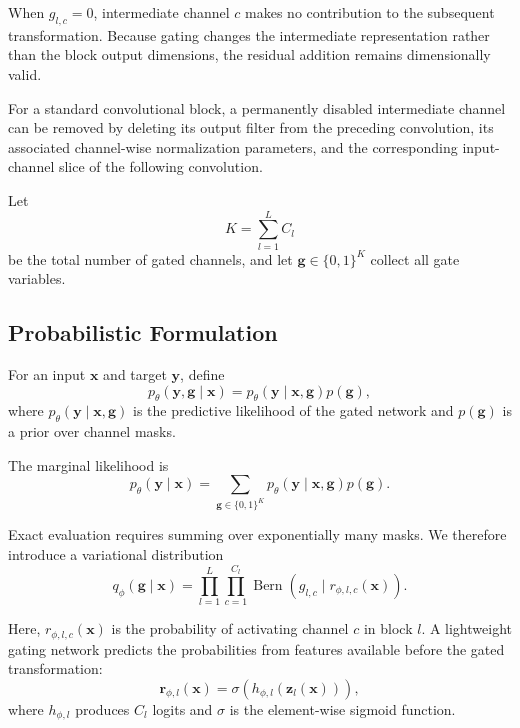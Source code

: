 \documentclass[sigplan,screen]{acmart}
\begin{document}
When $g_{l,c}=0$, intermediate channel $c$ makes no
contribution to the subsequent transformation. Because
gating changes the intermediate representation rather than
the block output dimensions, the residual addition remains
dimensionally valid.

For a standard convolutional block, a permanently disabled
intermediate channel can be removed by deleting its output
filter from the preceding convolution, its associated
channel-wise normalization parameters, and the corresponding
input-channel slice of the following convolution.

Let
\begin{equation}
K=\sum_{l=1}^{L}C_l
\end{equation}
be the total number of gated channels, and let
$\mathbf{g}\in\{0,1\}^{K}$ collect all gate variables.

\subsection{Probabilistic Formulation}

For an input $\mathbf{x}$ and target $\mathbf{y}$, define
\begin{equation}
p_\theta(\mathbf{y},\mathbf{g}\mid\mathbf{x})
=
p_\theta(\mathbf{y}\mid\mathbf{x},\mathbf{g})
p(\mathbf{g}),
\end{equation}
where $p_\theta(\mathbf{y}\mid\mathbf{x},\mathbf{g})$ is the
predictive likelihood of the gated network and
$p(\mathbf{g})$ is a prior over channel masks.

The marginal likelihood is
\begin{equation}
p_\theta(\mathbf{y}\mid\mathbf{x})
=
\sum_{\mathbf{g}\in\{0,1\}^{K}}
p_\theta(\mathbf{y}\mid\mathbf{x},\mathbf{g})
p(\mathbf{g}).
\end{equation}

Exact evaluation requires summing over exponentially many
masks. We therefore introduce a variational distribution
\begin{equation}
q_\phi(\mathbf{g}\mid\mathbf{x})
=
\prod_{l=1}^{L}\prod_{c=1}^{C_l}
\operatorname{Bern}
\left(
g_{l,c}\mid r_{\phi,l,c}(\mathbf{x})
\right).
\end{equation}

Here, $r_{\phi,l,c}(\mathbf{x})$ is the probability of
activating channel $c$ in block $l$. A lightweight gating
network predicts the probabilities from features available
before the gated transformation:
\begin{equation}
\mathbf{r}_{\phi,l}(\mathbf{x})
=
\sigma\left(
h_{\phi,l}(\mathbf{z}_l(\mathbf{x}))
\right),
\end{equation}
where $h_{\phi,l}$ produces $C_l$ logits and $\sigma$ is the
element-wise sigmoid function.
\end{document}
